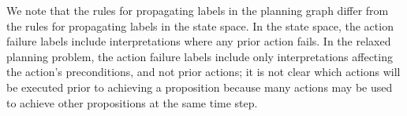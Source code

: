 \documentclass[letterpaper]{article}
\def\und#1{\noindent{\bf #1}:}
\begin{document}
We note that the rules for propagating labels in the planning graph differ from the rules for propagating labels in the state space.  In the state space, the action failure labels include interpretations where any prior action fails.  In the relaxed planning problem, the action failure labels include only interpretations affecting the action's preconditions, and not prior actions; it is not clear which actions will be executed prior to achieving a proposition because many actions may be used to achieve other propositions at the same time step.  

%
%
%
\end{document}
